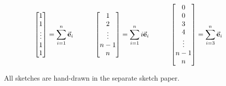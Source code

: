 \begin{exercise}{5}
  $$
    \begin{bmatrix}1\\1\\\vdots\\1\\1\end{bmatrix} = \sum\limits_{i=1}^n \vec{\mathbf{e}}_i
    \quad\quad\quad
    \begin{bmatrix}1\\2\\\vdots\\n-1\\n\end{bmatrix} = \sum\limits_{i=1}^n i\vec{\mathbf{e}}_i
    \quad\quad\quad
    \begin{bmatrix}0\\0\\3\\4\\\vdots\\n-1\\n\end{bmatrix} = \sum\limits_{i=3}^n \vec{\mathbf{e}}_i
  $$
\end{exercise}

\begin{exercise}{6}
  All sketches are hand-drawn in the separate sketch paper.
\end{exercise}

